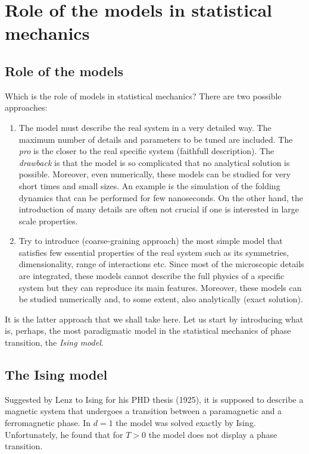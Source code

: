 \documentclass[../../Main/Main.tex]{subfiles}
\begin{document}
\chapter{Role of the models in statistical mechanics}
\section{Role of the models}
Which is the role of models in statistical mechanics? There are two possible approaches:
\begin{enumerate}
  \item The model must describe the real system in a very detailed way. The maximum number of details and parameters to be tuned are included. The \emph{pro} is the closer to the real specific system (faithfull description). The \emph{drawback} is that the model is so complicated that no analytical solution is possible. Moreover, even numerically, these models can be studied for very short times and small sizes.
  An example is the simulation of the folding dynamics that can be performed for few nanoseconds. On the other hand, the introduction of many details are often not crucial if one is interested in large scale properties.
  \item Try to introduce (coarse-graining approach) the most simple model that satisfies few essential properties of the real system such as its symmetries, dimensionality, range of interactions etc.
  Since most of the microscopic details are integrated, these models cannot describe the full physics of a specific system but they can reproduce its main features. Moreover, these models can be studied numerically and, to some extent, also analytically (exact solution).
\end{enumerate}

It is the latter approach that we shall take here.
  Let us start by introducing what is, perhaps, the most paradigmatic model in the statistical mechanics of phase transition, the \emph{Ising model}.

  \section{The Ising model}
  Suggested by Lenz to Ising for his PHD thesis (1925), it is supposed to describe a magnetic system that undergoes a transition between a paramagnetic and a ferromagnetic phase.
  In \( d=1 \) the model was solved exactly by Ising. Unfortunately, he found that for \( T>0 \) the model does not display a phase transition.
\end{document}
